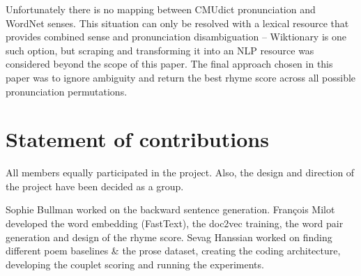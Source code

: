 \documentclass[11pt,a4paper]{article}
\begin{document}
Unfortunately there is no mapping between CMUdict pronunciation and WordNet senses. This situation can only be resolved with a lexical resource that provides combined sense and pronunciation disambiguation -- Wiktionary \cite{wiktionary} is one such option, but scraping and transforming it into an NLP resource was considered beyond the scope of this paper. The final approach chosen in this paper was to ignore ambiguity and return the best rhyme score across all possible pronunciation permutations.

\section{Statement of contributions}
\label{sec:contributions}
All members equally participated in the project. Also, the design and direction of the project have been decided as a group. 

Sophie Bullman worked on the backward sentence generation. François Milot developed the word embedding (FastText), the doc2vec training, the word pair generation and design of the rhyme score. Sevag Hanssian worked on finding different poem baselines \& the prose dataset, creating the coding architecture, developing the couplet scoring and running the experiments.



\end{document}
